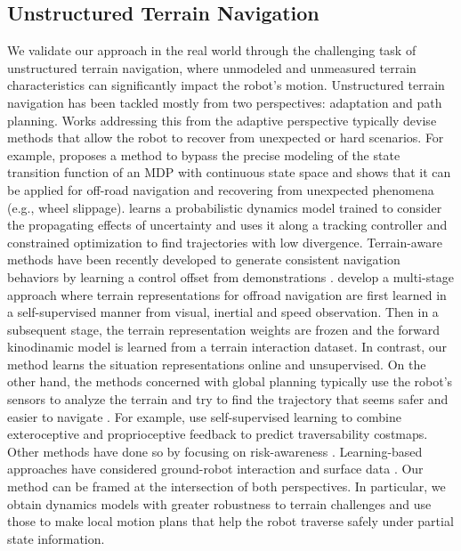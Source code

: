 \documentclass[Afour,sageh,times]{sagej}
\theoremstyle{lemma}
\begin{document}
\subsection{Unstructured Terrain Navigation}
We validate our approach in the real world through the challenging task of unstructured terrain navigation, where unmodeled and unmeasured terrain characteristics can significantly impact the robot's motion. 
Unstructured terrain navigation has been tackled mostly from two perspectives: adaptation and path planning. Works addressing this from the adaptive perspective typically devise methods that allow the robot to recover from unexpected or hard scenarios. For example, \citet{xu2024kernel} proposes a method to bypass the precise modeling of the state transition function of an MDP with continuous state space and shows that it can be applied for off-road navigation and recovering from unexpected phenomena (e.g., wheel slippage). \citet{wang2021rough} learns a probabilistic dynamics model trained to consider the propagating effects of uncertainty and uses it along a tracking controller and constrained optimization to find trajectories with low divergence. Terrain-aware methods have been recently developed to generate consistent navigation behaviors by learning a control offset from demonstrations \cite[]{siva2019robot, siva2021enhancing}. \cite{pokhrel2024cahsor} develop a multi-stage approach where terrain representations for offroad navigation are first learned in a self-supervised manner from visual, inertial and speed observation. Then in a subsequent stage, the terrain representation weights are frozen and the forward kinodinamic model is learned from a terrain interaction dataset. In contrast, our method learns the situation representations online and unsupervised.
On the other hand, the methods concerned with global planning typically use the robot's sensors to analyze the terrain and try to find the trajectory that seems safer and easier to navigate \cite[]{yoo2024traversability, jardali2024autonomous, leininger2024gaussian}.  For example, \cite{castro2022does} use self-supervised learning to combine exteroceptive and proprioceptive feedback to predict traversability costmaps.
Other methods have done so by focusing on risk-awareness \cite[]{sharma2023ramp, cai2022risk, cai2023probabilistic}. Learning-based approaches have considered ground-robot interaction and surface data \cite[]{sathyamoorthy2022terrapn}. Our method can be framed at the intersection of both perspectives. In particular, we obtain dynamics models with greater robustness to terrain challenges and use those to make local motion plans that help the robot traverse safely under partial state information.
\end{document}
